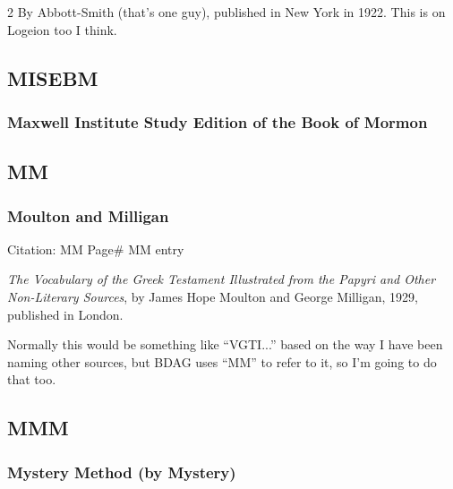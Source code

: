 \begin{multicols}{2}
			By Abbott-Smith (that's one guy), published in New York in 1922. This is on Logeion too I think.
			
	\subsection*{MISEBM}
	
		\subsubsection*{Maxwell Institute Study Edition of the Book of Mormon}
		
			\phantom{.}
			
	\subsection*{MM}
	
		\subsubsection*{Moulton and Milligan}
		
			Citation:
				MM Page\#
				MM entry
		
			\textit{The Vocabulary of the Greek Testament Illustrated from the Papyri and Other Non-Literary Sources}, by James Hope Moulton and George Milligan, 1929, published in London. 
			
			Normally this would be something like ``VGTI...'' based on the way I have been naming other sources, but BDAG uses ``MM'' to refer to it, so I'm going to do that too.
			
	\subsection*{MMM}
	
		\subsubsection*{Mystery Method (by Mystery)}
		

\end{multicols}
